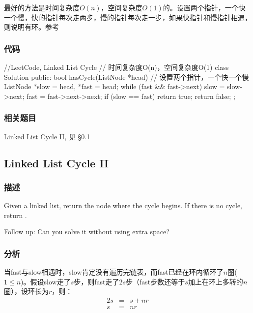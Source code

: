 最好的方法是时间复杂度$O(n)$，空间复杂度$O(1)$的。设置两个指针，一个快一个慢，快的指针每次走两步，慢的指针每次走一步，如果快指针和慢指针相遇，则说明有环。参考


\subsubsection{代码}
\begin{Code}
//LeetCode, Linked List Cycle
// 时间复杂度O(n)，空间复杂度O(1)
class Solution {
public:
    bool hasCycle(ListNode *head) {
        // 设置两个指针，一个快一个慢
        ListNode *slow = head, *fast = head;
        while (fast && fast->next) {
            slow = slow->next;
            fast = fast->next->next;
            if (slow == fast) return true;
        }
        return false;
    }
};
\end{Code}


\subsubsection{相关题目}
\begindot
\item Linked List Cycle II, 见 \S \ref{sec:Linked-List-Cycle-II}
\myenddot


\subsection{Linked List Cycle II}
\label{sec:Linked-List-Cycle-II}


\subsubsection{描述}
Given a linked list, return the node where the cycle begins. If there is no cycle, return .

Follow up:
Can you solve it without using extra space?


\subsubsection{分析}
当fast与slow相遇时，slow肯定没有遍历完链表，而fast已经在环内循环了$n$圈($1 \leq n$)。假设slow走了$s$步，则fast走了$2s$步（fast步数还等于$s$加上在环上多转的$n$圈），设环长为$r$，则：
\begin{eqnarray}
2s &=& s + nr \nonumber \\
s &=& nr \nonumber
\end{eqnarray}

